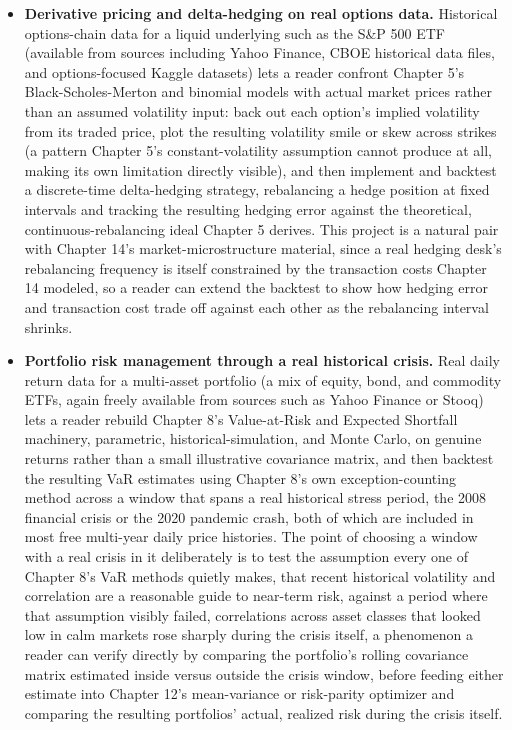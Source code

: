 \documentclass[../ai_in_finance]{subfiles}
\begin{document}
\begin{itemize}
    \item \textbf{Derivative pricing and delta-hedging on real options data.} Historical options-chain data for a liquid underlying such as the S\&P 500 ETF (available from sources including Yahoo Finance, CBOE historical data files, and options-focused Kaggle datasets) lets a reader confront Chapter 5's Black-Scholes-Merton and binomial models with actual market prices rather than an assumed volatility input: back out each option's implied volatility from its traded price, plot the resulting volatility smile or skew across strikes (a pattern Chapter 5's constant-volatility assumption cannot produce at all, making its own limitation directly visible), and then implement and backtest a discrete-time delta-hedging strategy, rebalancing a hedge position at fixed intervals and tracking the resulting hedging error against the theoretical, continuous-rebalancing ideal Chapter 5 derives. This project is a natural pair with Chapter 14's market-microstructure material, since a real hedging desk's rebalancing frequency is itself constrained by the transaction costs Chapter 14 modeled, so a reader can extend the backtest to show how hedging error and transaction cost trade off against each other as the rebalancing interval shrinks.
    \item \textbf{Portfolio risk management through a real historical crisis.} Real daily return data for a multi-asset portfolio (a mix of equity, bond, and commodity ETFs, again freely available from sources such as Yahoo Finance or Stooq) lets a reader rebuild Chapter 8's Value-at-Risk and Expected Shortfall machinery, parametric, historical-simulation, and Monte Carlo, on genuine returns rather than a small illustrative covariance matrix, and then backtest the resulting VaR estimates using Chapter 8's own exception-counting method across a window that spans a real historical stress period, the 2008 financial crisis or the 2020 pandemic crash, both of which are included in most free multi-year daily price histories. The point of choosing a window with a real crisis in it deliberately is to test the assumption every one of Chapter 8's VaR methods quietly makes, that recent historical volatility and correlation are a reasonable guide to near-term risk, against a period where that assumption visibly failed, correlations across asset classes that looked low in calm markets rose sharply during the crisis itself, a phenomenon a reader can verify directly by comparing the portfolio's rolling covariance matrix estimated inside versus outside the crisis window, before feeding either estimate into Chapter 12's mean-variance or risk-parity optimizer and comparing the resulting portfolios' actual, realized risk during the crisis itself.

\end{itemize}
\end{document}
